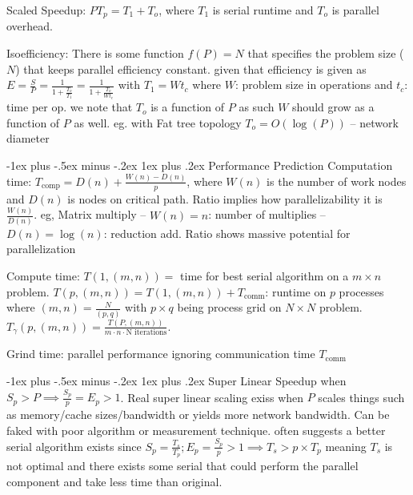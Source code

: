 \documentclass[letter,8pt,landscape]{article}
\makeatletter
\renewcommand{\subsubsection}{\@startsection{subsubsection}{3}{0mm}%
                                {-1ex plus -.5ex minus -.2ex}%
                                {1ex plus .2ex}%
                                {\normalfont\small\bfseries}}
\makeatother
\begin{document}
\begin{multicols}{3}
  Scaled Speedup: $PT_p = T_1 + T_o$, where $T_1$ is serial runtime and $T_o$ is
  parallel overhead.

  Isoefficiency: There is some function $f(P) = N$ that specifies the problem
  size ($N$) that keeps parallel efficiency constant. given that efficiency is
  given as $E = \frac{S}{P} = \frac{1}{1 + \frac{T_o}{T_1}} = \frac{1}{1 +
  \frac{T_o}{Wt_c}} $ with $T_1 = Wt_c$ where $W$: problem size in operations
  and $t_c$: time per op. we note that $T_o$ is a function of $P$ as such $W$
  should grow as a function of $P$ as well. eg. with Fat tree topology $T_o =
  O(\log(P))$ -- network diameter

  \subsubsection{Performance Prediction}
  Computation time: $T_\text{comp} = D(n) + \frac{W(n) - D(n)}{p}$, where $W(n)$
  is the number of work nodes and $D(n)$ is nodes on critical path. Ratio
  implies how parallelizability it is $\frac{W(n)}{D(n)}$. eg, Matrix multiply
  -- $W(n) = n$: number of multiplies -- $D(n) = \log(n)$: reduction add. Ratio
  shows massive potential for parallelization

  Compute time: $T(1, (m,n)) =$ time for best serial algorithm on a $m\times n$
  problem. $T(p, (m,n)) = T(1,(m,n)) + T_\text{comm}$: runtime on $p$ processes
  where $(m,n) = \frac{N}{(p,q)}$ with $p\times q$ being process grid on
  $N\times N$ problem.
  $T_\gamma(p, (m,n)) = \frac{T(P,(m,n))}{m\cdot n\cdot \text{N iterations}}$.
  
  Grind time: parallel performance ignoring communication time
  $T_\text{comm}$



  \subsubsection{Super Linear Speedup}
  when $S_p > P \implies \frac{S_p}{p} = E_p > 1$. Real super linear scaling
  exiss when $P$ scales things such as memory/cache sizes/bandwidth or yields
  more network bandwidth. Can be faked with poor algorithm or measurement
  technique. often suggests a better serial algorithm exists since $S_p =
  \frac{T_s}{T_p}; E_p = \frac{S_p}{p} > 1 \implies T_s > p\times T_p$ meaning
  $T_s$ is not optimal and there exists some serial that could perform the
  parallel component and take less time than original.



\end{multicols}
\end{document}
